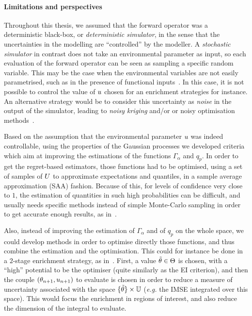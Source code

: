 \documentclass[../../Main_ManuscritThese.tex]{subfiles}
\begin{document}
\paragraph{Limitations and perspectives}
Throughout this thesis, we assumed that the forward operator was a
deterministic black-box, or \emph{deterministic simulator}, in the
sense that the uncertainties in the modelling are ``controlled'' by
the modeller. A \emph{stochastic simulator} in contrast does not take an
environmental parameter as input, so each evaluation of the
forward operator can be seen as sampling a specific random
variable. This may be the case when the environmental variables are
not easily parametrised, such as in the presence of functional
inputs~\citep{el_amri_analyse_2019}. In this case, it is not possible
to control the value of $u$ chosen for an enrichment strategies for
instance. An alternative strategy would be to consider this
uncertainty as \emph{noise} in the output of the simulator, leading to
\emph{noisy kriging} and/or or noisy optimisation
methods~\citep{picheny_noisy_2014}.

Based on the assumption that the environmental parameter $u$ was
indeed controllable, using the properties of the Gaussian processes we
developed criteria which aim at improving the estimations of the
functions $\Gamma_\alpha$ and $q_p$. In order to get the regret-based
estimators, those functions had to be optimised, using a set of
samples of $U$ to approximate expectations and quantiles, in a
sample average approximation (SAA) fashion. Because of this, for
levels of confidence very close to $1$, the estimation of quantities
in such high probabilities can be difficult, and usually needs
specific methods instead of simple Monte-Carlo sampling in order to
get accurate enough results, as in~\cite{razaaly_rare_2019}.

Also, instead of improving the estimation of $\Gamma_{\alpha}$ and of
$q_p$ on the whole space, we could develop methods in order to
optimise directly those functions, and thus combine the estimation and
the optimisation.  This could for instance be done in a $2$-stage
enrichment strategy, as
in~\cite{janusevskis_simultaneous_2010}. First, a value
$\tilde{\theta} \in \Theta$ is chosen, with a ``high'' potential to be
the optimiser (quite similarly as the EI criterion), and then the
couple $(\theta_{n+1}, u_{n+1})$ to evaluate is chosen in order to
reduce a measure of uncertainty associated with the space
$\{\tilde{\theta}\} \times \mathbb{U}$ (\emph{e.g.} the IMSE integrated over
this space). This would focus the enrichment in regions of interest,
and also reduce the dimension of the integral to evaluate.
\end{document}
